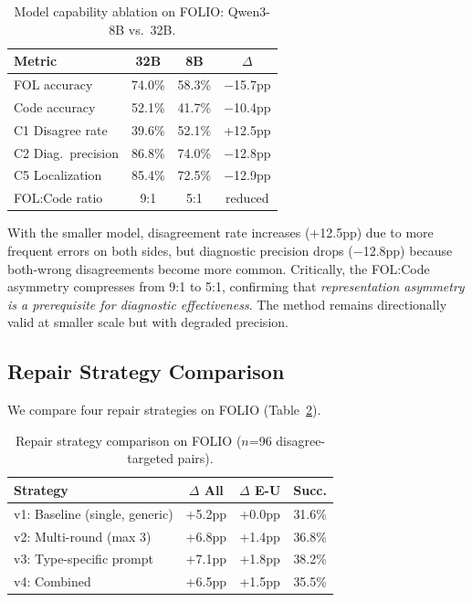 \documentclass[11pt,a4paper]{article}
\begin{document}
\begin{table}[t]
\centering
\small
\caption{Model capability ablation on FOLIO: Qwen3-8B vs.\ 32B.}
\label{tab:model-cap}
\begin{tabular}{lccc}
\toprule
\textbf{Metric} & \textbf{32B} & \textbf{8B} & \textbf{$\Delta$} \\
\midrule
FOL accuracy & 74.0\% & 58.3\% & $-$15.7pp \\
Code accuracy & 52.1\% & 41.7\% & $-$10.4pp \\
C1 Disagree rate & 39.6\% & 52.1\% & +12.5pp \\
C2 Diag.\ precision & 86.8\% & 74.0\% & $-$12.8pp \\
C5 Localization & 85.4\% & 72.5\% & $-$12.9pp \\
FOL:Code ratio & 9:1 & 5:1 & reduced \\
\bottomrule
\end{tabular}
\end{table}

With the smaller model, disagreement rate increases (+12.5pp) due to more frequent errors on both sides, but diagnostic precision drops ($-$12.8pp) because both-wrong disagreements become more common. Critically, the FOL:Code asymmetry compresses from 9:1 to 5:1, confirming that \emph{representation asymmetry is a prerequisite for diagnostic effectiveness}. The method remains directionally valid at smaller scale but with degraded precision.

\subsection{Repair Strategy Comparison}
\label{sec:repair-strategies}

We compare four repair strategies on FOLIO (Table~\ref{tab:repair-strategy}).

\begin{table}[t]
\centering
\small
\caption{Repair strategy comparison on FOLIO ($n$=96 disagree-targeted pairs).}
\label{tab:repair-strategy}
\begin{tabular}{lccc}
\toprule
\textbf{Strategy} & \textbf{$\Delta$ All} & \textbf{$\Delta$ E-U} & \textbf{Succ.} \\
\midrule
v1: Baseline (single, generic) & +5.2pp & +0.0pp & 31.6\% \\
v2: Multi-round (max 3) & +6.8pp & +1.4pp & 36.8\% \\
v3: Type-specific prompt & +7.1pp & +1.8pp & 38.2\% \\
v4: Combined & +6.5pp & +1.5pp & 35.5\% \\
\bottomrule
\end{tabular}
\end{table}
\end{document}

